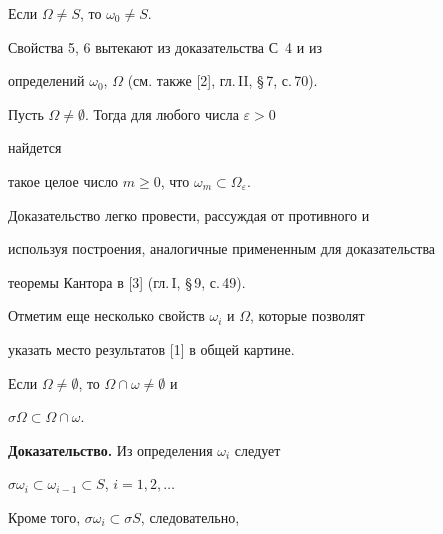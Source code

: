  


\begin{pty} 


Если $\Omega\ne S$, то $\omega_0\ne S$. 


\end{pty} 


 


Свойства 5, 6 вытекают из доказательства С~4 и из 


определений $\omega_0$, $\Omega$ (см. также [2], гл.\,II, \S\,7, с.\,70). 


 


\begin{pty} 


Пусть $\Omega\ne\emptyset$. Тогда для любого числа $\varepsilon>0$ 


найдется 


такое целое число $m\ge0$, что $\omega_m\subset\Omega_\varepsilon$. 


\end{pty} 


 


Доказательство легко провести, рассуждая от противного и 


используя построения, аналогичные примененным для доказательства 


теоремы Кантора в [3] (гл.\,I, \S\,9, с.\,49). 


 


Отметим еще несколько свойств $\omega_i$ и $\Omega$, которые позволят 


указать место результатов [1] в общей картине. 


 


\begin{pty} 


Если $\Omega\ne\emptyset$, то $\Omega\cap\omega\ne\emptyset$ и 


$\sigma\Omega\subset\Omega\cap\omega$. 


\end{pty} 


 


{\bf Доказательство.} Из определения $\omega_i$ следует 


$\sigma\omega_i\subset\omega_{i-1}\subset S$, $i=1,2,\dotsc$ 


Кроме того, $\sigma\omega_i\subset\sigma S$, следовательно,


